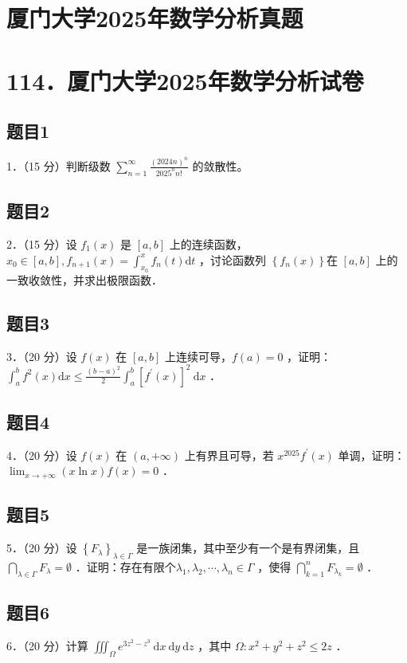 \documentclass{article}
\begin{document}
\section*{厦门大学2025年数学分析真题}
\section*{114．厦门大学2025年数学分析试卷}

\subsection{题目1}
1．（15 分）判断级数 \(\sum_{n=1}^{\infty} \frac{(2024 n)^{n}}{2025^{n} n!}\) 的敛散性。

\subsection{题目2}
2．（15 分）设 \(f_{1}(x)\) 是 \([a, b]\) 上的连续函数，\(x_{0} \in[a, b], f_{n+1}(x)=\int_{x_{0}}^{x} f_{n}(t) \mathrm{d} t\) ，讨论函数列 \(\left\{f_{n}(x)\right\}\)在 \([a, b]\) 上的一致收敛性，并求出极限函数．

\subsection{题目3}
3．（20 分）设 \(f(x)\) 在 \([a, b]\) 上连续可导，\(f(a)=0\) ，证明： \(\int_{a}^{b} f^{2}(x) \mathrm{d} x \leq \frac{(b-a)^{2}}{2} \int_{a}^{b}\left[f^{\prime}(x)\right]^{2} \mathrm{~d} x\) ．

\subsection{题目4}
4．（20 分）设 \(f(x)\) 在 \((a,+\infty)\) 上有界且可导，若 \(x^{2025} f^{\prime}(x)\) 单调，证明： \(\lim _{x \rightarrow+\infty}(x \ln x) f(x)=0\) ．

\subsection{题目5}
5．（20 分）设 \(\left\{F_{\lambda}\right\}_{\lambda \in \Gamma}\) 是一族闭集，其中至少有一个是有界闭集，且 \(\bigcap_{\lambda \in \Gamma} F_{\lambda}=\emptyset\) ．证明：存在有限个\(\lambda_{1}, \lambda_{2}, \cdots, \lambda_{n} \in \Gamma\) ，使得 \(\bigcap_{k=1}^{n} F_{\lambda_{k}}=\emptyset\) ．

\subsection{题目6}
6．（20 分）计算 \(\iiint_{\Omega} e^{3 z^{2}-z^{3}} \mathrm{~d} x \mathrm{~d} y \mathrm{~d} z\) ，其中 \(\Omega: x^{2}+y^{2}+z^{2} \leq 2 z\) ．
\end{document}
